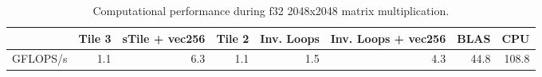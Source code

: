 \begin{table}
\centering
\caption{Computational performance during f32 2048x2048 matrix multiplication.}
\begin{tabular}{lrrrrrrr}
\toprule
{} &  Tile 3 &  sTile + vec256 &  Tile 2 &  Inv. Loops &  Inv. Loops + vec256 &  BLAS &   CPU \\
\midrule
GFLOPS/s &     1.1 &             6.3 &     1.1 &         1.5 &                  4.3 &  44.8 & 108.8 \\
\bottomrule
\end{tabular}
\end{table}
